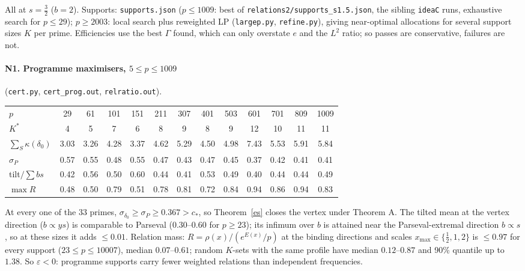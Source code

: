 All at $s=\frac32$ ($b=2$).  Supports: \texttt{supports.json} ($p\le1009$: best of \texttt{relations2/supports\_s1.5.json}, the sibling
\texttt{ideaC} runs, exhaustive search for $p\le29$); $p\ge2003$: local search plus reweighted LP (\texttt{largep.py}, \texttt{refine.py}),
giving near-optimal allocations for several support sizes $K$ per prime.  Efficiencies use the best $\Gamma$ found, which can only overstate $e$
and the $L^2$ ratio; so passes are conservative, failures are not.

\paragraph{N1. Programme maximisers, $5\le p\le1009$} (\texttt{cert.py}, \texttt{cert\_prog.out}, \texttt{relratio.out}).
\begin{center}\small\begin{tabular}{lcccccccccccc}\toprule
$p$ & 29 & 61 & 101 & 151 & 211 & 307 & 401 & 503 & 601 & 701 & 809 & 1009\\
$K^*$ & 4 & 5 & 7 & 6 & 8 & 9 & 8 & 9 & 12 & 10 & 11 & 11\\
$\sum_S\kappa(\delta_0)$ & 3.03 & 3.26 & 4.28 & 3.37 & 4.62 & 5.29 & 4.50 & 4.98 & 7.43 & 5.53 & 5.91 & 5.84\\
$\sigma_P$ & 0.57 & 0.55 & 0.48 & 0.55 & 0.47 & 0.43 & 0.47 & 0.45 & 0.37 & 0.42 & 0.41 & 0.41\\
tilt$/\sum bs$ & 0.42 & 0.56 & 0.50 & 0.60 & 0.44 & 0.41 & 0.53 & 0.49 & 0.40 & 0.44 & 0.44 & 0.49\\
$\max R$ & 0.48 & 0.50 & 0.79 & 0.51 & 0.78 & 0.81 & 0.72 & 0.84 & 0.94 & 0.86 & 0.94 & 0.83\\\bottomrule
\end{tabular}\end{center}
At every one of the 33 primes, $\sigma_{\delta_0}\ge\sigma_P\ge0.367>c_*$, so Theorem~\ref{es} closes the vertex under Theorem A.
The tilted mean at the vertex direction ($b\propto ys$) is comparable to Parseval ($0.30$--$0.60$ for $p\ge23$); its infimum over $b$ is attained near the
Parseval-extremal direction $b\propto s$, so at these sizes it adds $\le0.01$.  Relation mass: $R=\rho(x)/(e^{E(x)}/p)$ at the binding directions and scales
$x_{\max}\in\{\frac12,1,2\}$ is $\le0.97$ for every support ($23\le p\le10007$), median $0.07$--$0.61$; random $K$-sets with the same profile have median
$0.12$--$0.87$ and 90\% quantile up to $1.38$.  So $\varepsilon<0$: programme supports carry fewer weighted relations than independent frequencies.

